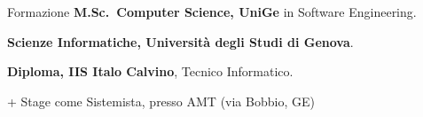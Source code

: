 \begin{rubric}{Formazione}
\entry*[09/2023 -- 2026]%
	\textbf{M.Sc.~Computer Science, UniGe} in Software Engineering.\par
%
\entry*[09/2019 -- 02/2024]%
	\textbf{Scienze Informatiche, Università degli Studi di Genova}.\par
% 
\entry*[2014 -- 2019]%
	\textbf{Diploma, IIS Italo Calvino}, Tecnico Informatico.\par
    + Stage come Sistemista, presso AMT (via Bobbio, GE)
\end{rubric}